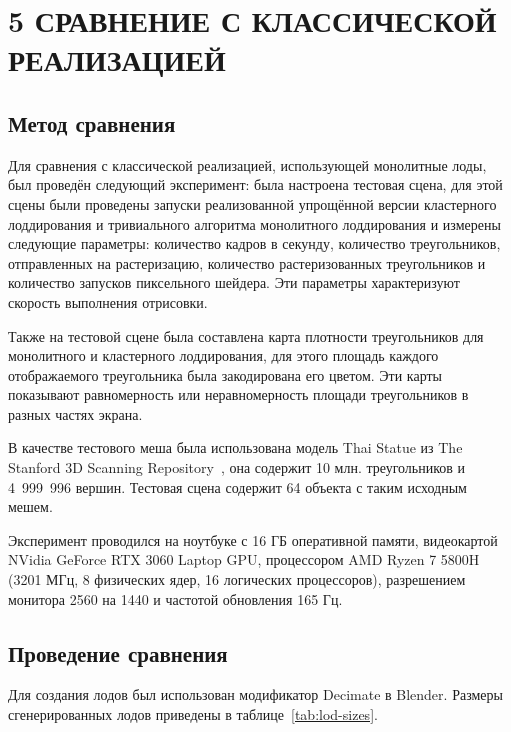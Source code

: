 \clearpage
\section{5 СРАВНЕНИЕ С КЛАССИЧЕСКОЙ РЕАЛИЗАЦИЕЙ}
\subsection*{Метод сравнения}
Для сравнения с классической реализацией, использующей монолитные лоды, был проведён следующий эксперимент: была настроена тестовая сцена, для этой сцены были проведены запуски реализованной упрощённой версии кластерного лоддирования и тривиального алгоритма монолитного лоддирования и измерены следующие параметры: количество кадров в секунду, количество треугольников, отправленных на растеризацию, количество растеризованных треугольников и количество запусков пиксельного шейдера.
Эти параметры характеризуют скорость выполнения отрисовки.

Также на тестовой сцене была составлена карта плотности треугольников для монолитного и кластерного лоддирования, для этого площадь каждого отображаемого треугольника была закодирована его цветом.
Эти карты показывают равномерность или неравномерность площади треугольников в разных частях экрана.

В качестве тестового меша была использована модель Thai Statue из The Stanford 3D Scanning Repository~\cite{StanfordRepo}, она содержит 10 млн. треугольников и 4~999~996 вершин.
Тестовая сцена содержит 64 объекта с таким исходным мешем.

Эксперимент проводился на ноутбуке с 16 ГБ оперативной памяти, видеокартой NVidia GeForce RTX 3060 Laptop GPU, процессором AMD Ryzen 7 5800H (3201 МГц, 8 физических ядер, 16 логических процессоров), разрешением монитора 2560 на 1440 и частотой обновления 165 Гц.

\subsection*{Проведение сравнения}
Для создания лодов был использован модификатор Decimate в Blender.
Размеры сгенерированных лодов приведены в таблице~\ref{tab:lod-sizes}.

